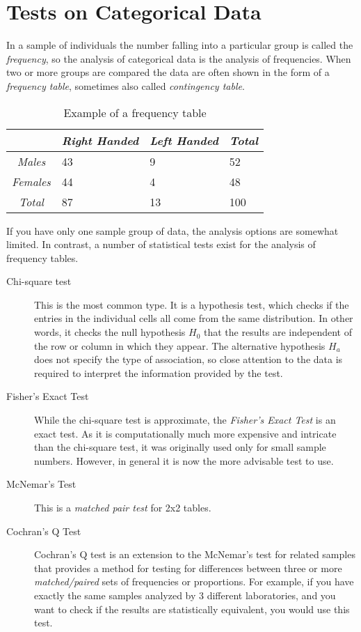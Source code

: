 \chapter{Tests on Categorical Data }

In a sample of individuals the number falling into a particular group is called the \emph{frequency}, so the analysis of categorical data is the analysis of frequencies. When two or more groups are compared the data are often shown in the form of a \emph{frequency table}, sometimes also called \emph{contingency table}.

\begin{table}
  \centering
  \begin{tabular}{|c|l l l|}
  \hline
  & \emph{Right Handed} & \emph{Left Handed} & \emph{Total} \\
  \hline
  \emph{Males} & 43 & 9 & 52 \\
  \emph{Females} & 44 & 4 & 48 \\
  \emph{Total} & 87 & 13 & 100 \\
  \hline
  \end{tabular}

  \caption{Example of a frequency table}\label{table:frequency}
\end{table}

If you have only one sample group of data, the analysis options are somewhat limited. In contrast, a number of statistical tests exist for the analysis of frequency tables.

\begin{description}
  \item[Chi-square test] This is the most common type. It is a hypothesis test, which checks if the entries in the individual cells all come from the same distribution. In other words, it checks the null hypothesis $H_0$ that the results are independent of the row or column in which they appear. The alternative hypothesis $H_a$ does not specify the type of association, so close attention to the data is required to interpret the information provided by the test.
  \item[Fisher's Exact Test] While the chi-square test is approximate, the \emph{Fisher's Exact Test} is an exact test. As it is computationally much more expensive and intricate than the chi-square test, it was originally used only for small sample numbers. However, in general it is now the more advisable test to use.
  \item[McNemar's Test]  This is a \emph{matched pair test }for 2x2 tables.
  \item[Cochran's Q Test]  Cochran's Q test is an extension to the McNemar's test for related samples that provides a method for testing for differences between three or more \emph{matched/paired} sets of frequencies or proportions. For example, if you have exactly the same samples analyzed by 3 different laboratories, and you want to check if the results are statistically equivalent, you would use this test.
\end{description}


